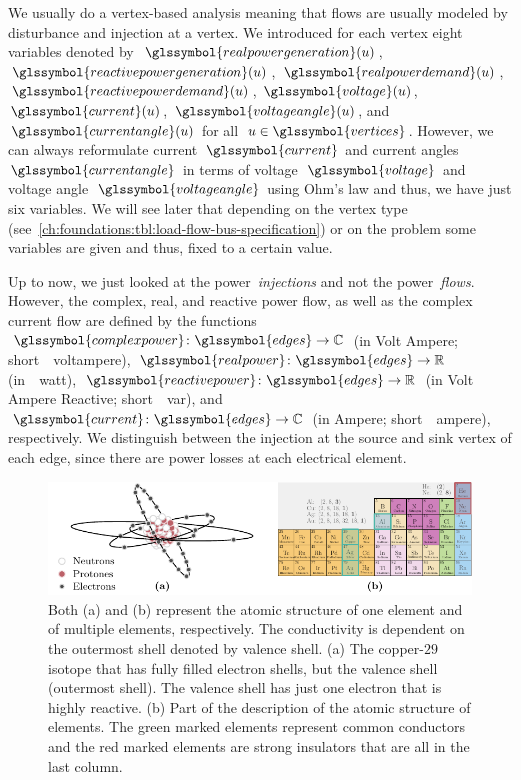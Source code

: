We usually do a vertex-based analysis meaning that flows are usually modeled by
disturbance and injection at a vertex. We introduced for each vertex eight
variables denoted by~$\glssymbol{realpowergeneration}(\vertexa)$,
$\glssymbol{reactivepowergeneration}(\vertexa)$, $\glssymbol{realpowerdemand}
(\vertexa)$, $\glssymbol{reactivepowerdemand}(\vertexa)$,
$\glssymbol{voltage}(\vertexa)$, $\glssymbol{current}(\vertexa)$,
$\glssymbol{voltageangle}(\vertexa)$, and~$\glssymbol{currentangle}(\vertexa)$
for all~$\vertexa\in\glssymbol{vertices}$. However, we can always reformulate
current~$\glssymbol{current}$ and current angles~$\glssymbol{currentangle}$ in
terms of voltage~$\glssymbol{voltage}$ and voltage
angle~$\glssymbol{voltageangle}$ using Ohm's law and thus, we have just six
variables. We will see later that depending on the vertex type
(see~\cref{ch:foundations:tbl:load-flow-bus-specification}) or on the problem
some variables are given and thus, fixed to a certain value.

Up to now, we just looked at the power~\emph{injections} and not the
power~\emph{flows}. However, the complex, real, and reactive power flow, as well
as the complex current flow are defined by the
functions~$\glssymbol{complexpower}\colon\glssymbol{edges}\to\complexes$ (in
Volt Ampere; short~\SI{}{\gls{voltampere}}), $\glssymbol{realpower}\colon
\glssymbol{edges}\to\reals$ (in~\SI{}{\gls{watt}}),
$\glssymbol{reactivepower}\colon\glssymbol{edges}\to\reals$ (in Volt Ampere
Reactive; short~\SI{}{\gls{var}}), and~$\glssymbol{current}\colon
\glssymbol{edges}\to\complexes$ (in Ampere; short~\SI{}{\gls{ampere}}),
respectively. We distinguish between the injection at the source and sink vertex
of each edge, since there are power losses at each electrical element. 
% 
\begin{figure}
    \includegraphics{foundations/figures/admittance.pdf}
    \caption[Relationship between conductivity and the material's atomic
    structure.]{Both (a) and (b) represent the atomic structure of one element
    and of multiple elements, respectively. The conductivity is dependent on the
    outermost shell denoted by valence shell. (a) The copper-$29$ isotope that
    has fully filled electron shells, but the valence shell (outermost shell).
    The valence shell has just one electron that is highly reactive. (b) Part of
    the description of the atomic structure of elements. The green marked
    elements represent common conductors and the red marked elements are strong
    insulators that are all in the last column.%
    }%
    \label{ch:foundations:sec:power-flow-analyses:fig:atomic-structure}
\end{figure}
% 
